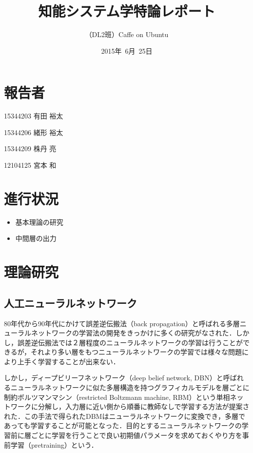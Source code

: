 \documentclass[a4paper,10pt]{jsarticle}
\title{知能システム学特論レポート}
\author{
（DL2班）Caffe on Ubuntu\\
}
\date{2015年\ 6月\ 25日}
\begin{document}
\maketitle
\section{報告者}
\begin{list}{}{}
 \item 15344203\hspace{0.5cm} 有田 裕太
 \item 15344206\hspace{0.5cm} 緒形 裕太
 \item 15344209\hspace{0.5cm} 株丹 亮
 \item 12104125\hspace{0.5cm} 宮本 和
\end{list}

\section{進行状況}
\begin{itemize}
\item 基本理論の研究
\item 中間層の出力
\end{itemize}

\section{理論研究}
\subsection{人工ニューラルネットワーク}
80年代から90年代にかけて誤差逆伝搬法（back propagation）と呼ばれる多層ニューラルネットワークの学習法の開発をきっかけに多くの研究がなされた．しかし，誤差逆伝搬法では２層程度のニューラルネットワークの学習は行うことができるが，それより多い層をもつニューラルネットワークの学習では様々な問題により上手く学習することが出来ない．

しかし，ディープビリーフネットワーク（deep belief network, DBN）と呼ばれるニューラルネットワークに似た多層構造を持つグラフィカルモデルを層ごとに制約ボルツマンマシン（restricted Boltzmann machine, RBM）という単相ネットワークに分解し，入力層に近い側から順番に教師なしで学習する方法が提案された．この手法で得られたDBMはニューラルネットワークに変換でき，多層であっても学習することが可能となった．目的とするニューラルネットワークの学習前に層ごとに学習を行うことで良い初期値パラメータを求めておくやり方を事前学習（pretraining）という．
\end{document}
